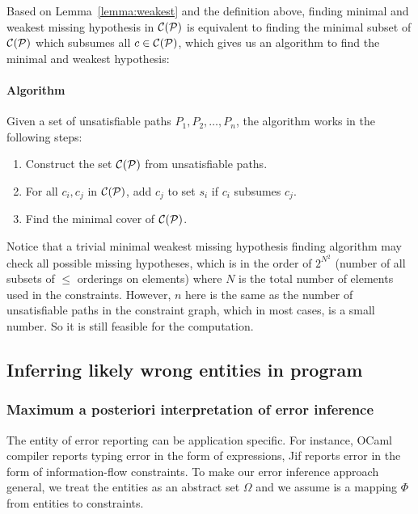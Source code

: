 Based on Lemma~\ref{lemma:weakest} and the definition above, finding
minimal and weakest missing hypothesis in $\mathcal{C}(\mathcal{P})$ is
equivalent to finding the minimal subset of $\mathcal{C}(\mathcal{P})$ which
subsumes all $c\in \mathcal{C}(\mathcal{P})$, which gives us an algorithm to
find the minimal and weakest hypothesis:

\paragraph{Algorithm}

Given a set of unsatisfiable paths $P_1, P_2, \dots, P_n$, the
algorithm works in the following steps:

\begin{enumerate}
\item Construct the set $\mathcal{C}(\mathcal{P})$ from unsatisfiable paths.

\item For all $c_i, c_j$ in $\mathcal{C}(\mathcal{P})$, add $c_j$
to set $s_i$ if $c_i$ subsumes $c_j$.

\item Find the minimal cover of $\mathcal{C}(\mathcal{P})$.
\end{enumerate}

Notice that a trivial minimal weakest missing hypothesis finding
algorithm may check all possible missing hypotheses, which is in the
order of $2^{N^2}$ (number of all subsets of $\leq$ orderings on
elements) where $N$ is the total number of elements used in the
constraints. However, $n$ here is the same as the number of
unsatisfiable paths in the constraint graph, which in most cases, is a
small number. So it is still feasible for the computation.


\subsection{Inferring likely wrong entities in program}
\label{sec:mapmodel}

\subsubsection{Maximum a posteriori interpretation of error inference}

The entity of error reporting can be application specific. For
instance, OCaml compiler reports typing error in the form of
expressions, Jif reports error in the form of information-flow
constraints. To make our error inference approach general, we treat
the entities as an abstract set $\Omega$ and we assume is a mapping
$\Phi$ from entities to constraints.

